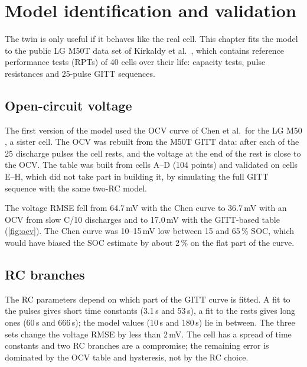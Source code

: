 \chapter{Model identification and validation}\label{ch:models}

The twin is only useful if it behaves like the real cell. This chapter fits the model to the public LG M50T data set of Kirkaldy et al.\ \citep{kirkaldy2024,kirkaldy2024data}, which contains reference performance tests (RPTs) of 40 cells over their life: capacity tests, pulse resistances and 25-pulse GITT sequences.

\section{Open-circuit voltage}\label{sec:ocv}
The first version of the model used the OCV curve of Chen et al.\ for the LG M50 \citep{chen2020}, a sister cell. The OCV was rebuilt from the M50T GITT data: after each of the 25 discharge pulses the cell rests, and the voltage at the end of the rest is close to the OCV. The table was built from cells A--D (104 points) and validated on cells E--H, which did not take part in building it, by simulating the full GITT sequence with the same two-RC model.

The voltage RMSE fell from 64.7\,mV with the Chen curve to 36.7\,mV with an OCV from slow C/10 discharges and to 17.0\,mV with the GITT-based table (\cref{fig:ocv}). The Chen curve was 10--15\,mV low between 15 and 65\,\% SOC, which would have biased the SOC estimate by about 2\,\% on the flat part of the curve.


\section{RC branches}
The RC parameters depend on which part of the GITT curve is fitted. A fit to the pulses gives short time constants (3.1\,s and 53\,s), a fit to the rests gives long ones (60\,s and 666\,s); the model values (10\,s and 180\,s) lie in between. The three sets change the voltage RMSE by less than 2\,mV. The cell has a spread of time constants and two RC branches are a compromise; the remaining error is dominated by the OCV table and hysteresis, not by the RC choice.

